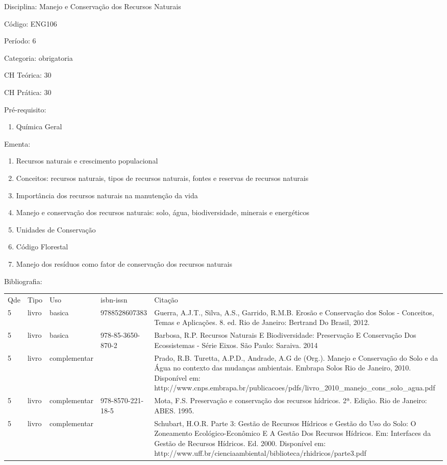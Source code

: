 \documentclass[12pt,a4paper,twoside]{report}
\begin{document}
Disciplina: Manejo e Conservação dos Recursos Naturais

Código: ENG106

Período: 6

Categoria: obrigatoria

CH Teórica: 30

CH Prática: 30




Pré-requisito:
\begin{enumerate}
\item Química Geral
\end{enumerate}

Ementa:
\begin{enumerate}
\item Recursos naturais e crescimento populacional
\item Conceitos: recursos naturais, tipos de recursos naturais, fontes e reservas de recursos naturais
\item Importância dos recursos naturais na manutenção da vida
\item Manejo e conservação dos recursos naturais: solo, água, biodiversidade, minerais e energéticos
\item Unidades de Conservação
\item Código Florestal
\item Manejo dos resíduos como fator de conservação dos recursos naturais
\end{enumerate}



Bibliografia:


\begin{tabular}{llllp{8cm}}
Qde & Tipo & Uso & isbn-issn & Citação \\
5&livro&basica&9788528607383&Guerra, A.J.T., Silva, A.S., Garrido, R.M.B. Erosão e Conservação dos Solos - Conceitos, Temas e Aplicações. 8. ed. Rio de Janeiro: Bertrand Do Brasil, 2012.\\
5&livro&basica&978-85-3650-870-2&Barbosa, R.P. Recursos Naturais E Biodiversidade: Preservação E Conservação Dos Ecossistemas - Série Eixos. São Paulo: Saraiva. 2014\\
5&livro&complementar&&Prado, R.B. Turetta, A.P.D., Andrade, A.G de (Org.). Manejo e Conservação do Solo e da Água no contexto das mudanças ambientais. Embrapa Solos Rio de Janeiro, 2010. Disponível em: http://www.cnps.embrapa.br/publicacoes/pdfs/livro_2010_manejo_cons_solo_agua.pdf\\
5&livro&complementar&978-8570-221-18-5&Mota, F.S. Preservação e conservação dos recursos hídricos. 2ª. Edição. Rio de Janeiro: ABES. 1995.\\
5&livro&complementar&&Schubart, H.O.R. Parte 3: Gestão de Recursos Hídricos e Gestão do Uso do Solo: O Zoneamento Ecológico-Econômico E A Gestão Dos Recursos Hídricos. Em: Interfaces da Gestão de Recursos Hídricos. Ed. 2000. Disponível em: http://www.uff.br/cienciaambiental/biblioteca/rhidricos/parte3.pdf\\
\end{tabular}
\end{document}
